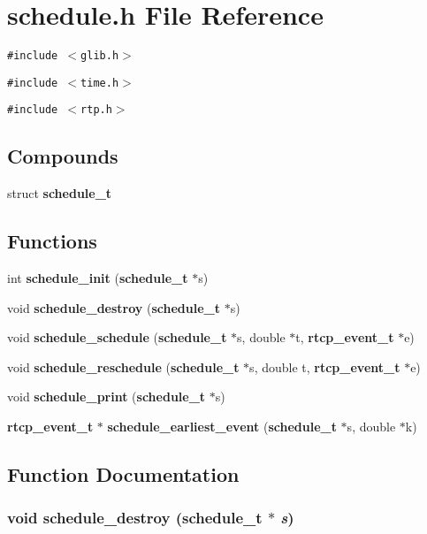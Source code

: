 \section{schedule.h File Reference}
\label{schedule_8h}
{\tt \#include $<$glib.h$>$}\par
{\tt \#include $<$time.h$>$}\par
{\tt \#include $<$rtp.h$>$}\par
\subsection*{Compounds}
\begin{CompactItemize}
\item 
struct {\bf schedule\_\-t}
\end{CompactItemize}
\subsection*{Functions}
\begin{CompactItemize}
\item 
int {\bf schedule\_\-init} ({\bf schedule\_\-t} $\ast$s)
\item 
void {\bf schedule\_\-destroy} ({\bf schedule\_\-t} $\ast$s)
\item 
void {\bf schedule\_\-schedule} ({\bf schedule\_\-t} $\ast$s, double $\ast$t, {\bf rtcp\_\-event\_\-t} $\ast$e)
\item 
void {\bf schedule\_\-reschedule} ({\bf schedule\_\-t} $\ast$s, double t, {\bf rtcp\_\-event\_\-t} $\ast$e)
\item 
void {\bf schedule\_\-print} ({\bf schedule\_\-t} $\ast$s)
\item 
{\bf rtcp\_\-event\_\-t} $\ast$ {\bf schedule\_\-earliest\_\-event} ({\bf schedule\_\-t} $\ast$s, double $\ast$k)
\end{CompactItemize}


\subsection{Function Documentation}
\subsubsection{\setlength{\rightskip}{0pt plus 5cm}void schedule\_\-destroy ({\bf schedule\_\-t} $\ast$ {\em s})}\label{schedule_8h_a1}


